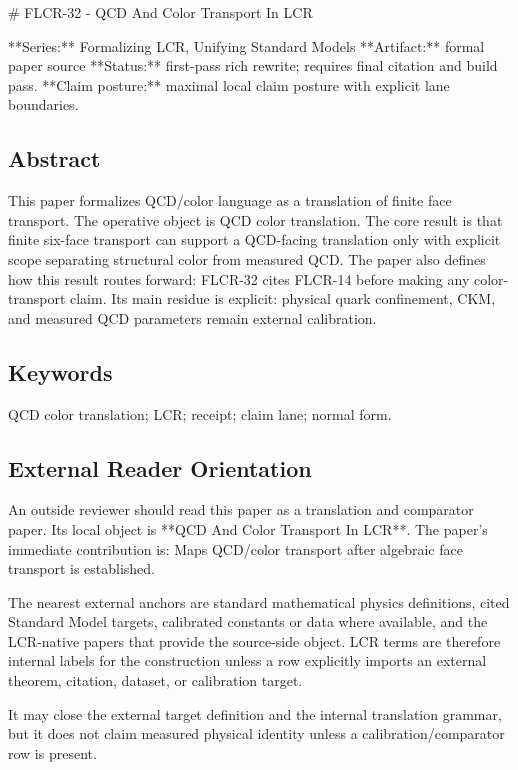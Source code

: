 \documentclass[11pt]{article}
\begin{document}
﻿\# FLCR-32 - QCD And Color Transport In LCR

**Series:** Formalizing LCR, Unifying Standard Models
**Artifact:** formal paper source
**Status:** first-pass rich rewrite; requires final citation and build pass.
**Claim posture:** maximal local claim posture with explicit lane boundaries.

\subsection*{Abstract}

This paper formalizes QCD/color language as a translation of finite face transport. The operative object is QCD color translation. The core result is that finite six-face transport can support a QCD-facing translation only with explicit scope separating structural color from measured QCD. The paper also defines how this result routes forward: FLCR-32 cites FLCR-14 before making any color-transport claim. Its main residue is explicit: physical quark confinement, CKM, and measured QCD parameters remain external calibration.

\subsection*{Keywords}

QCD color translation; LCR; receipt; claim lane; normal form.

\subsection*{External Reader Orientation}

An outside reviewer should read this paper as a translation and comparator paper. Its local object is **QCD And Color Transport In LCR**. The paper's immediate contribution is: Maps QCD/color transport after algebraic face transport is established.

The nearest external anchors are standard mathematical physics definitions, cited Standard Model targets, calibrated constants or data where available, and the LCR-native papers that provide the source-side object. LCR terms are therefore internal labels for the construction unless a row explicitly imports an external theorem, citation, dataset, or calibration target.

It may close the external target definition and the internal translation grammar, but it does not claim measured physical identity unless a calibration/comparator row is present.
\end{document}
